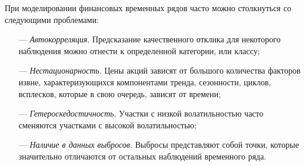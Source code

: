 \par При моделировании финансовых временных рядов часто можно столкнуться со следующими проблемами:

\begin{itemize}[leftmargin=1.6\parindent]
    \item[---] \textit{Автокорреляция}. Предсказание качественного отклика для некоторого наблюдения можно отнести к определенной категории, или классу;
	\item[---] \textit{Нестационарность}. Цены акций зависят от большого количества факторов извне, характеризующихся компонентами тренда, сезонности, циклов, всплесков, которые в
    свою очередь, зависят от времени;
    \item[---] \textit{Гетероскедостичность}. Участки с низкой
волатильностью часто сменяются участками с высокой волатильностью;
    \item[---] \textit{Наличие в данных выбросов}. Выбросы представляют собой точки, которые значительно отличаются от остальных наблюдений временного ряда.
\end{itemize}
